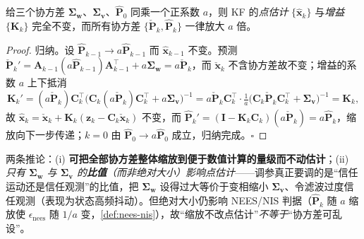 \begin{proposition}[协方差等比缩放不变性]\label{prop:kf-cov-scaling}
给三个协方差 $\boldsymbol{\Sigma}_{\mathbf{w}}$、$\boldsymbol{\Sigma}_{\mathbf{v}}$、$\hat{\mathbf{P}}_0$ 同乘一个正系数 $a$，则 KF 的\emph{点估计} $\{\hat{\mathbf{x}}_k\}$ 与\emph{增益} $\{\mathbf{K}_k\}$ 完全不变，而所有协方差 $\{\check{\mathbf{P}}_k,\hat{\mathbf{P}}_k\}$ 一律放大 $a$ 倍\cite{unitree2023quadruped}。
\end{proposition}
\begin{proof}
归纳。设 $\hat{\mathbf{P}}_{k-1}\to a\hat{\mathbf{P}}_{k-1}$ 而 $\hat{\mathbf{x}}_{k-1}$ 不变。预测 $\check{\mathbf{P}}_k'=\mathbf{A}_{k-1}(a\hat{\mathbf{P}}_{k-1})\mathbf{A}_{k-1}^\top+a\boldsymbol{\Sigma}_{\mathbf{w}}=a\check{\mathbf{P}}_k$，而 $\check{\mathbf{x}}_k$ 不含协方差故不变；增益的系数 $a$ 上下抵消
\[
  \mathbf{K}_k'=(a\check{\mathbf{P}}_k)\mathbf{C}_k^\top\big(\mathbf{C}_k(a\check{\mathbf{P}}_k)\mathbf{C}_k^\top+a\boldsymbol{\Sigma}_{\mathbf{v}}\big)^{-1}
  =a\check{\mathbf{P}}_k\mathbf{C}_k^\top\cdot\tfrac1a\big(\mathbf{C}_k\check{\mathbf{P}}_k\mathbf{C}_k^\top+\boldsymbol{\Sigma}_{\mathbf{v}}\big)^{-1}=\mathbf{K}_k,
\]
故 $\hat{\mathbf{x}}_k=\check{\mathbf{x}}_k+\mathbf{K}_k(\mathbf{z}_k-\mathbf{C}_k\check{\mathbf{x}}_k)$ 不变，而 $\hat{\mathbf{P}}_k'=(\mathbf{I}-\mathbf{K}_k\mathbf{C}_k)(a\check{\mathbf{P}}_k)=a\hat{\mathbf{P}}_k$，缩放向下一步传递；$k=0$ 由 $\hat{\mathbf{P}}_0\to a\hat{\mathbf{P}}_0$ 成立，归纳完成。\hfill$\square$
\end{proof}
\noindent 两条推论：(i) \textbf{可把全部协方差整体缩放到便于数值计算的量级而不动估计}；(ii) \emph{只有 $\boldsymbol{\Sigma}_{\mathbf{w}}$ 与 $\boldsymbol{\Sigma}_{\mathbf{v}}$ 的\textbf{比值}（而非绝对大小）影响点估计}——调参真正要调的是“信任运动还是信任观测”的比值，把 $\boldsymbol{\Sigma}_{\mathbf{w}}$ 设得过大等价于变相缩小 $\boldsymbol{\Sigma}_{\mathbf{v}}$、令滤波过度信任观测（表现为状态高频抖动）。但绝对大小仍影响 NEES/NIS 判据（$\hat{\mathbf{P}}_k$ 随 $a$ 缩放使 $\epsilon_{\text{nees}}$ 随 $1/a$ 变，\cref{def:nees-nis}），故“缩放不改点估计”\emph{不等于}“协方差可乱设”。

